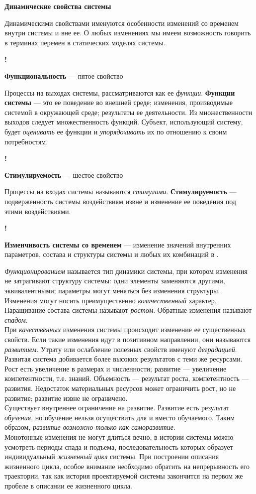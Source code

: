 \documentclass{article}
\newcommand{\note}[1]{\textit{#1}}
\renewcommand{\subsection}[1]{
	\vspace{2em}
	\begin{flushright}
		\large
		\textbf{#1}
	\end{flushright}
	}
\newcommand{\define}[2]{
	\textbf{#1} --- #2
	}
\newcommand{\marked}[2]{
	\begin{flushright}\textbf{!}\hspace{2ex}\vline\hspace{2ex}
		\begin{minipage}{0.9\textwidth}
			\define{#1}{#2}
		\end{minipage}
	\end{flushright}
	}
\begin{document}
\subsection{Динамические свойства системы}
Динамическими свойствами именуются особенности изменений со временем внутри системы и вне ее. О любых изменениях мы имеем возможность говорить в терминах перемен в статических моделях системы.
\marked{Функциональность}{пятое свойство}
Процессы на выходах системы, рассматриваются как ее \note{функции}.\define{Функции системы}{это ее поведение во внешней среде; изменения, производимые системой в окружающей среде; результаты ее деятельности.} Из множественности выходов следует множественность функций. Субъект, использующий систему, будет \note{оценивать} ее функции и \note{упорядочивать} их по отношению к своим потребностям.
\marked{Стимулируемость}{шестое свойство}
Процессы на входах системы называются \note{стимулами}.\define{Стимулируемость}{подверженность системы воздействиям извне и изменение ее поведения под этими воздействиями.}
\marked{Изменчивость системы со временем}{изменение значений внутренних параметров, состава и структуры системы и любых их комбинаций в .}
\note{Функционированием} называется тип динамики системы, при котором изменения не затрагивают структуру системы: одни элементы заменяются другими, эквивалентными; параметры могут меняться без изменения структуры.\\
Изменения могут носить преимущественно \note{количественный} характер. Наращивание состава системы называют \note{ростом}. Обратные изменения называют \note{спадом}.\\
При \note{качественных} изменения системы происходит изменение ее существенных свойств. Если такие изменения идут в позитивном направлении, они называются \note{развитием}. Утрату или ослабление полезных свойств именуют \note{деградацией}. Развитая система добивается более высоких результатов с теми же ресурсами.\\
Рост есть увеличение в размерах и численности; развитие --- увеличение компетентности, т.е. знаний. Объемность --- результат роста, компетентность --- развития. Недостаток материальных ресурсов может ограничить рост, но не развитие; развитие извне не ограничено.\\
Существует внутреннее ограничение на развитие. Развитие есть результат \note{обучения}, но обучение нельзя осуществить для и вместо обучаемого. Таким образом, \note{развитие возможно только как саморазвитие}.\\
Монотонные изменения не могут длиться вечно, в истории системы можно усмотреть периоды спада и подъема, последовательность которых образует индивидуальный \note{жизненный цикл} системы. При построении описания жизненного цикла, особое внимание необходимо обратить на непрерывность его траектории, так как история проектируемой системы закончится на первом же пробеле в описании ее жизненного цикла.
\end{document}
